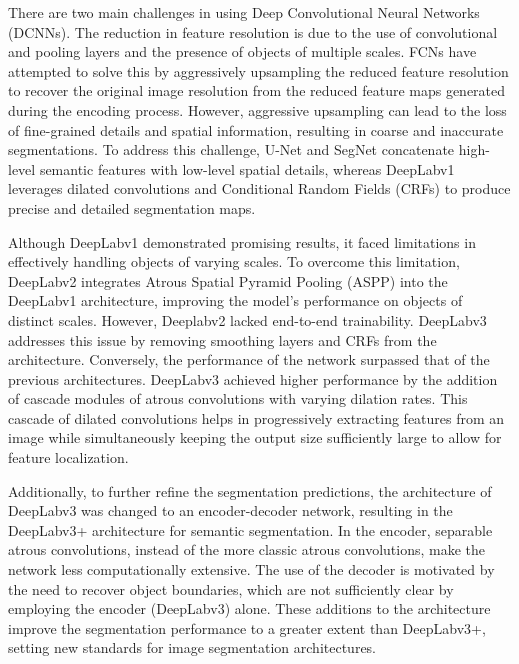 \documentclass{ieeeaccess}
\begin{document}
There are two main challenges in using Deep Convolutional Neural Networks (DCNNs). The reduction in feature resolution is due to the use of convolutional and pooling layers and the presence of objects of multiple scales.
FCNs have attempted to solve this by aggressively upsampling the reduced feature resolution to recover the original image resolution from the reduced feature maps generated during the encoding process.
However, aggressive upsampling can lead to the loss of fine-grained details and spatial information, resulting in coarse and inaccurate segmentations.
To address this challenge, U-Net and SegNet concatenate high-level semantic features with low-level spatial details, whereas DeepLabv1 leverages dilated convolutions and Conditional Random Fields (CRFs) to produce precise and detailed segmentation maps.

Although DeepLabv1 demonstrated promising results, it faced limitations in effectively handling objects of varying scales. To overcome this limitation, DeepLabv2 integrates Atrous Spatial Pyramid Pooling (ASPP) into the DeepLabv1 architecture, improving the model's performance on objects of distinct scales.
However, Deeplabv2 lacked end-to-end trainability.
DeepLabv3 addresses this issue by removing smoothing layers and CRFs from the architecture. Conversely, the performance of the network surpassed that of the previous architectures. DeepLabv3 achieved higher performance by the addition of cascade modules of atrous convolutions with varying dilation rates. This cascade of dilated convolutions helps in progressively extracting features from an image while simultaneously keeping the output size sufficiently large to allow for feature localization. 

Additionally, to further refine the segmentation predictions, the architecture of DeepLabv3 was changed to an encoder-decoder network, resulting in the DeepLabv3+ architecture for semantic segmentation.
In the encoder, separable atrous convolutions, instead of the more classic atrous convolutions, make the network less computationally extensive.
The use of the decoder is motivated by the need to recover object boundaries, which are not sufficiently clear by employing the encoder (DeepLabv3) alone.
These additions to the architecture improve the segmentation performance to a greater extent than DeepLabv3+, setting new standards for image segmentation architectures.

\vspace{0.3cm}
\end{document}
